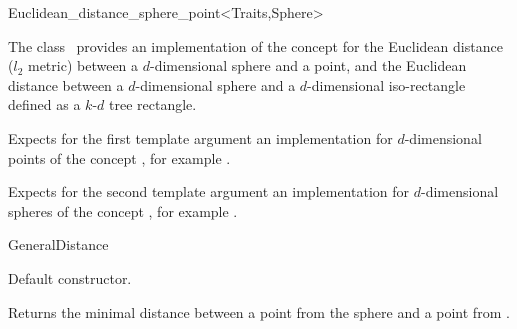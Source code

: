 

\begin{ccRefClass}{Euclidean_distance_sphere_point<Traits,Sphere>}  %


\ccDefinition
  
The class \ccRefName\ provides an implementation of the
 concept for the Euclidean distance ($l_2$
metric) between a $d$-dimensional sphere and a point, and the
Euclidean distance between a $d$-dimensional sphere and a
$d$-dimensional iso-rectangle defined as a $k$-$d$ tree rectangle.



\ccParameters
Expects for the first template argument an implementation for
$d$-dimensional points of the concept , for example
.

Expects for the second template argument an implementation 
for $d$-dimensional spheres of the concept ,
for example .


\ccIsModel

GeneralDistance

\ccTypes



\ccCreation
{}  %


{Default constructor.}

\ccOperations


{Returns the minimal distance between a point from the sphere  and a point from
.}


\end{ccRefClass}
